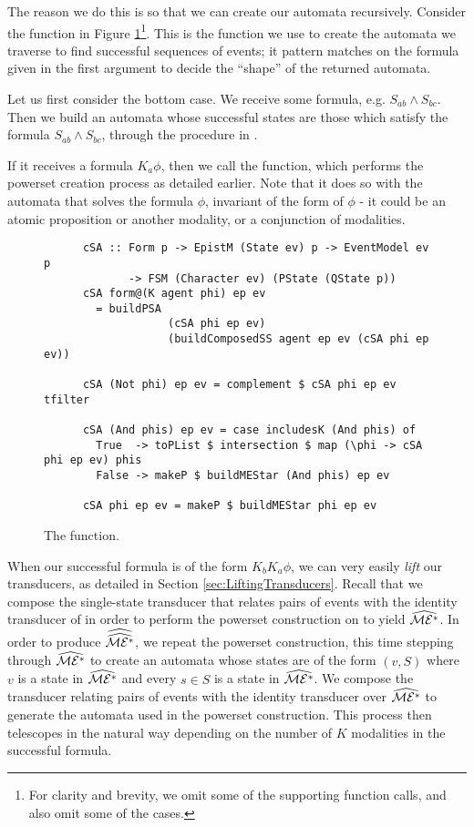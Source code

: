 \documentclass[10pt, a4paper]{report}
\begin{document}


The reason we do this is so that we can create our automata recursively.
Consider the function in Figure \ref{fig:createSolvingAutomata}\footnote{For clarity
  and brevity, we omit some of the supporting function calls, and also omit some
  of the cases.}. This is the function we use to create the automata we traverse
to find successful sequences of events; it pattern matches on the formula given
in the first argument to decide the ``shape'' of the returned automata.

Let us first consider the bottom case. We receive some formula, e.g. $S_{ab}
\land S_{bc}$. Then we build an automata \mestar whose successful states are
those which satisfy the formula $S_{ab} \land S_{bc}$, through the procedure in
. 

If it receives a formula $K_a \phi$, then we call the 
function, which performs the powerset creation process as detailed earlier. Note
that it does so with the automata that solves the formula $\phi$, invariant of
the form of $\phi$ - it could be an atomic proposition or another modality, or a
conjunction of modalities. 

\begin{figure}[h]
  \centering
    \begin{verbatim}
      cSA :: Form p -> EpistM (State ev) p -> EventModel ev p
             -> FSM (Character ev) (PState (QState p))
      cSA form@(K agent phi) ep ev
        = buildPSA 
                   (cSA phi ep ev) 
                   (buildComposedSS agent ep ev (cSA phi ep ev)) 

      cSA (Not phi) ep ev = complement $ cSA phi ep ev tfilter

      cSA (And phis) ep ev = case includesK (And phis) of
        True  -> toPList $ intersection $ map (\phi -> cSA phi ep ev) phis
        False -> makeP $ buildMEStar (And phis) ep ev

      cSA phi ep ev = makeP $ buildMEStar phi ep ev
    \end{verbatim}
  \caption{The  function.}
  \label{fig:createSolvingAutomata}
\end{figure}

When our successful formula is of the form $K_b K_a \phi$, we can very easily
\emph{lift} our transducers, as detailed in Section
\ref{sec:LiftingTransducers}. Recall that we compose the single-state transducer
that relates pairs of events with the identity transducer of \mestar in order to
perform the powerset construction on \mestar to yield $\widehat{\mathcal{ME^\ast}}$. In
order to produce $\widehat{\widehat{\mathcal{ME^\ast}}}$, we repeat the powerset construction,
this time stepping through $\widehat{\mathcal{ME^\ast}}$ to create an automata whose
states are of the form $(v, S)$ where $v$ is a state in $\widehat{\mathcal{ME^\ast}}$ and
every $s \in S$ is a state in $\widehat{\mathcal{ME^\ast}}$. We compose the transducer
relating pairs of events with the identity transducer over $\widehat{\mathcal{ME^\ast}}$
to generate the automata used in the powerset construction. This process then
telescopes in the natural way depending on the number of $K$ modalities in the
successful formula.
\end{document}

